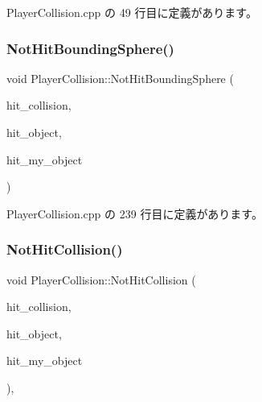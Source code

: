  Player\+Collision.\+cpp の 49 行目に定義があります。

\mbox{\label{class_player_collision_adce9e2df2361cadba7bbe397810a1893}} 
\subsubsection{\texorpdfstring{Not\+Hit\+Bounding\+Sphere()}{NotHitBoundingSphere()}}
{\footnotesize\ttfamily void Player\+Collision\+::\+Not\+Hit\+Bounding\+Sphere (\begin{DoxyParamCaption}\item[{\mbox{\hyperlink{class_collision_base}{Collision\+Base}} $\ast$}]{hit\+\_\+collision,  }\item[{\mbox{\hyperlink{class_collision_object}{Collision\+Object}} $\ast$}]{hit\+\_\+object,  }\item[{\mbox{\hyperlink{class_collision_object}{Collision\+Object}} $\ast$}]{hit\+\_\+my\+\_\+object }\end{DoxyParamCaption})\hspace{0.3cm}{\ttfamily [private]}}



 Player\+Collision.\+cpp の 239 行目に定義があります。

\mbox{\label{class_player_collision_a21b8f825ea142024212ab5fe3f427ab0}} 
\subsubsection{\texorpdfstring{Not\+Hit\+Collision()}{NotHitCollision()}}
{\footnotesize\ttfamily void Player\+Collision\+::\+Not\+Hit\+Collision (\begin{DoxyParamCaption}\item[{\mbox{\hyperlink{class_collision_base}{Collision\+Base}} $\ast$}]{hit\+\_\+collision,  }\item[{\mbox{\hyperlink{class_collision_object}{Collision\+Object}} $\ast$}]{hit\+\_\+object,  }\item[{\mbox{\hyperlink{class_collision_object}{Collision\+Object}} $\ast$}]{hit\+\_\+my\+\_\+object }\end{DoxyParamCaption})\hspace{0.3cm}{\ttfamily [override]}, {\ttfamily [virtual]}}



